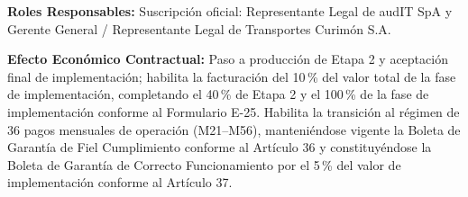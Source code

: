\par\noindent\textbf{Roles Responsables:} Suscripción oficial: Representante Legal de audIT SpA y Gerente General / Representante Legal de Transportes Curimón S.A.\par
\par\noindent\textbf{Efecto Económico Contractual:} Paso a producción de Etapa 2 y aceptación final de implementación; habilita la facturación del 10\,\% del valor total de la fase de implementación, completando el 40\,\% de Etapa 2 y el 100\,\% de la fase de implementación conforme al Formulario E-25. Habilita la transición al régimen de 36 pagos mensuales de operación (M21--M56), manteniéndose vigente la Boleta de Garantía de Fiel Cumplimiento conforme al Artículo 36 y constituyéndose la Boleta de Garantía de Correcto Funcionamiento por el 5\,\% del valor de implementación conforme al Artículo 37.\par

